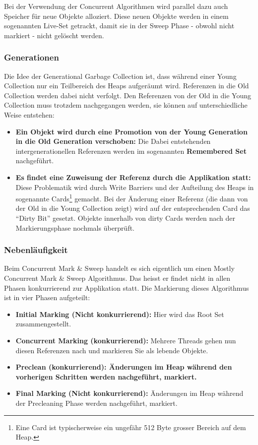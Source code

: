 Bei der Verwendung der Concurrent Algorithmen wird parallel dazu auch Speicher für neue Objekte alloziert. Diese neuen Objekte werden in einem sogenannten Live-Set getrackt, damit sie in der Sweep Phase - obwohl nicht markiert - nicht gelöscht werden.

\subsubsection{Generationen}
Die Idee der Generational Garbage Collection ist, dass während einer Young Collection nur ein Teilbereich des Heaps aufgeräumt wird. Referenzen in die Old Collection werden dabei nicht verfolgt. Den Referenzen von der Old in die Young Collection muss trotzdem nachgegangen werden, sie können auf unterschiedliche Weise entstehen:
\begin{itemize}
	\item \textbf{Ein Objekt wird durch eine Promotion von der Young Generation in die Old Generation verschoben:} Die Dabei entstehenden intergenerationellen Referenzen werden im sogenannten \textbf{Remembered Set} nachgeführt. 
	\item \textbf{Es findet eine Zuweisung der Referenz durch die Applikation statt:} Diese Problematik wird durch Write Barriers und der Aufteilung des Heaps in sogenannte Cards\footnote{Eine Card ist typischerweise ein ungefähr 512 Byte grosser Bereich auf dem Heap.} gemacht. Bei der Änderung einer Referenz (die dann von der Old in die Young Collection zeigt) wird auf der entsprechenden Card das ``Dirty Bit'' gesetzt. Objekte innerhalb von dirty Cards werden nach der Markierungsphase nochmals überprüft.
\end{itemize}

\subsubsection{Nebenläufigkeit}
Beim Concurrent Mark \& Sweep handelt es sich eigentlich um einen Mostly Concurrent Mark \& Sweep Algorithmus. Das heisst er findet nicht in allen Phasen konkurrierend zur Applikation statt. Die Markierung dieses Algorithmus ist in vier Phasen aufgeteilt:
\begin{itemize}
	\item \textbf{Initial Marking (Nicht konkurrierend):} Hier wird das Root Set zusammengestellt.
	\item \textbf{Concurrent Marking (konkurrierend):} Mehrere Threads gehen nun diesen Referenzen nach und markieren Sie als lebende Objekte.
	\item \textbf{Preclean (konkurrierend): Änderungen im Heap während den vorherigen Schritten werden nachgeführt, markiert.}
	\item \textbf{Final Marking (Nicht konkurrierend):} Änderungen im Heap während der Precleaning Phase werden nachgeführt, markiert.
\end{itemize}

